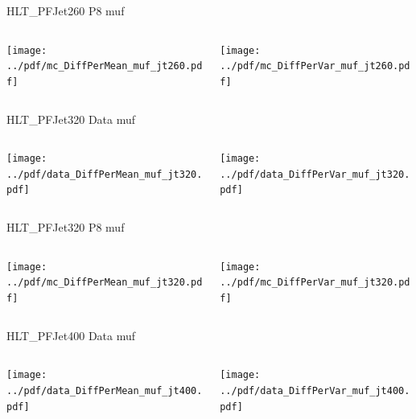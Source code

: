 \documentclass[9pt]{beamer}
\begin{document}
\begin{frame}[t]{HLT\_PFJet260 P8 muf}
\begin{columns}[T]
  \begin{column}{.5\textwidth}
  \texttt{[image: ../pdf/mc\_DiffPerMean\_muf\_jt260.pdf]}
  \end{column}
  \begin{column}{.5\textwidth}
  \texttt{[image: ../pdf/mc\_DiffPerVar\_muf\_jt260.pdf]}
  \end{column}
\end{columns}
\end{frame}

\begin{frame}[t]{HLT\_PFJet320 Data muf}
\begin{columns}[T]
  \begin{column}{.5\textwidth}
  \texttt{[image: ../pdf/data\_DiffPerMean\_muf\_jt320.pdf]}
  \end{column}
  \begin{column}{.5\textwidth}
  \texttt{[image: ../pdf/data\_DiffPerVar\_muf\_jt320.pdf]}
  \end{column}
\end{columns}
\end{frame}

\begin{frame}[t]{HLT\_PFJet320 P8 muf}
\begin{columns}[T]
  \begin{column}{.5\textwidth}
  \texttt{[image: ../pdf/mc\_DiffPerMean\_muf\_jt320.pdf]}
  \end{column}
  \begin{column}{.5\textwidth}
  \texttt{[image: ../pdf/mc\_DiffPerVar\_muf\_jt320.pdf]}
  \end{column}
\end{columns}
\end{frame}

\begin{frame}[t]{HLT\_PFJet400 Data muf}
\begin{columns}[T]
  \begin{column}{.5\textwidth}
  \texttt{[image: ../pdf/data\_DiffPerMean\_muf\_jt400.pdf]}
  \end{column}
  \begin{column}{.5\textwidth}
  \texttt{[image: ../pdf/data\_DiffPerVar\_muf\_jt400.pdf]}
  \end{column}
\end{columns}
\end{frame}
\end{document}
